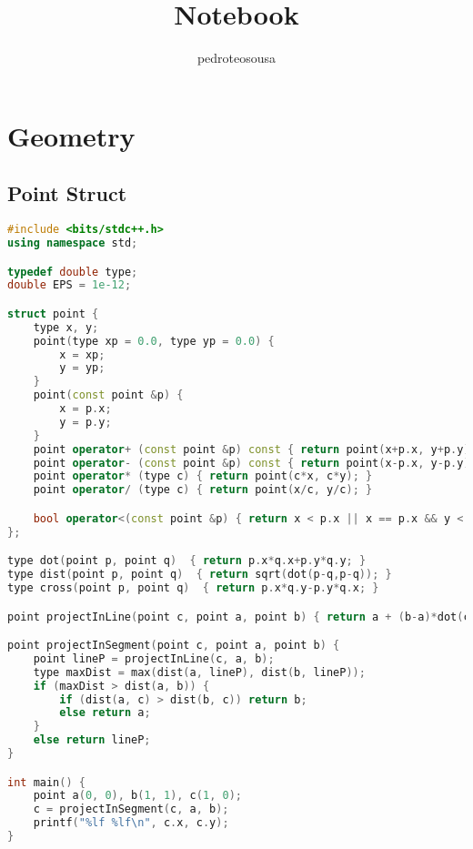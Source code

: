 \documentclass{article}
\title{Notebook}
\author{pedroteosousa }
\date{}
\begin{document}
\maketitle
\tableofcontents

\section{Geometry}
\subsection{Point Struct}
\begin{lstlisting}[language=C++]
#include <bits/stdc++.h>
using namespace std;

typedef double type;
double EPS = 1e-12;

struct point {
    type x, y;
    point(type xp = 0.0, type yp = 0.0) {
        x = xp;
        y = yp;
    }
    point(const point &p) {
        x = p.x;
        y = p.y;
    }
    point operator+ (const point &p) const { return point(x+p.x, y+p.y); }
    point operator- (const point &p) const { return point(x-p.x, y-p.y); }
    point operator* (type c) { return point(c*x, c*y); }
    point operator/ (type c) { return point(x/c, y/c); }

    bool operator<(const point &p) { return x < p.x || x == p.x && y < p.y;}
};

type dot(point p, point q)  { return p.x*q.x+p.y*q.y; }
type dist(point p, point q)  { return sqrt(dot(p-q,p-q)); }
type cross(point p, point q)  { return p.x*q.y-p.y*q.x; }

point projectInLine(point c, point a, point b) { return a + (b-a)*dot(c-a, b-a)/dot(b-a, b-a); }

point projectInSegment(point c, point a, point b) {
    point lineP = projectInLine(c, a, b);
    type maxDist = max(dist(a, lineP), dist(b, lineP));
    if (maxDist > dist(a, b)) {
        if (dist(a, c) > dist(b, c)) return b;
        else return a;
    }
    else return lineP;
}

int main() {
	point a(0, 0), b(1, 1), c(1, 0);
	c = projectInSegment(c, a, b);
	printf("%lf %lf\n", c.x, c.y);
}
\end{lstlisting}
\end{document}

